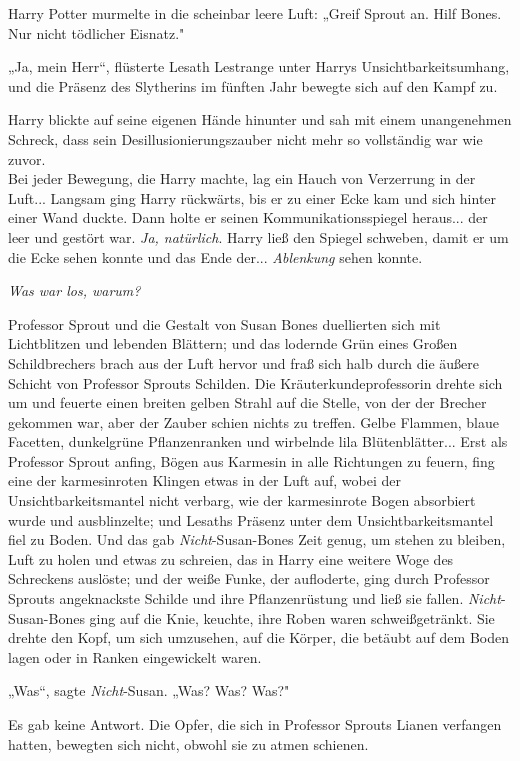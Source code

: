 {Harry Potter murmelte in die scheinbar leere Luft: „Greif Sprout an. Hilf Bones. Nur nicht tödlicher Eisnatz."

„Ja, mein Herr“, flüsterte Lesath Lestrange unter Harrys Unsichtbarkeitsumhang, und die Präsenz des Slytherins im fünften Jahr bewegte sich auf den Kampf zu.

Harry blickte auf seine eigenen Hände hinunter und sah mit einem unangenehmen Schreck, dass sein Desillusionierungszauber nicht mehr so vollständig war wie zuvor.\\ Bei jeder Bewegung, die Harry machte, lag ein Hauch von Verzerrung in der Luft... Langsam ging Harry rückwärts, bis er zu einer Ecke kam und sich hinter einer Wand duckte. Dann holte er seinen Kommunikationsspiegel heraus... der leer und gestört war. \emph{Ja, natürlich}. Harry ließ den Spiegel schweben, damit er um die Ecke sehen konnte und das Ende der... \emph{Ablenkung} sehen konnte.

\emph{Was war los, warum?}

Professor Sprout und die Gestalt von Susan Bones duellierten sich mit Lichtblitzen und lebenden Blättern; und das lodernde Grün eines Großen Schildbrechers brach aus der Luft hervor und fraß sich halb durch die äußere Schicht von Professor Sprouts Schilden. Die Kräuterkundeprofessorin drehte sich um und feuerte einen breiten gelben Strahl auf die Stelle, von der der Brecher gekommen war, aber der Zauber schien nichts zu treffen. Gelbe Flammen, blaue Facetten, dunkelgrüne Pflanzenranken und wirbelnde lila Blütenblätter... Erst als Professor Sprout anfing, Bögen aus Karmesin in alle Richtungen zu feuern, fing eine der karmesinroten Klingen etwas in der Luft auf, wobei der Unsichtbarkeitsmantel nicht verbarg, wie der karmesinrote Bogen absorbiert wurde und ausblinzelte; und Lesaths Präsenz unter dem Unsichtbarkeitsmantel fiel zu Boden. Und das gab \emph{Nicht}-Susan-Bones Zeit genug, um stehen zu bleiben, Luft zu holen und etwas zu schreien, das in Harry eine weitere Woge des Schreckens auslöste; und der weiße Funke, der aufloderte, ging durch Professor Sprouts angeknackste Schilde und ihre Pflanzenrüstung und ließ sie fallen. \emph{Nicht}-Susan-Bones ging auf die Knie, keuchte, ihre Roben waren schweißgetränkt. Sie drehte den Kopf, um sich umzusehen, auf die Körper, die betäubt auf dem Boden lagen oder in Ranken eingewickelt waren.

„Was“, sagte \emph{Nicht}-Susan. „Was? Was? Was?"

Es gab keine Antwort. Die Opfer, die sich in Professor Sprouts Lianen verfangen hatten, bewegten sich nicht, obwohl sie zu atmen schienen.

}
